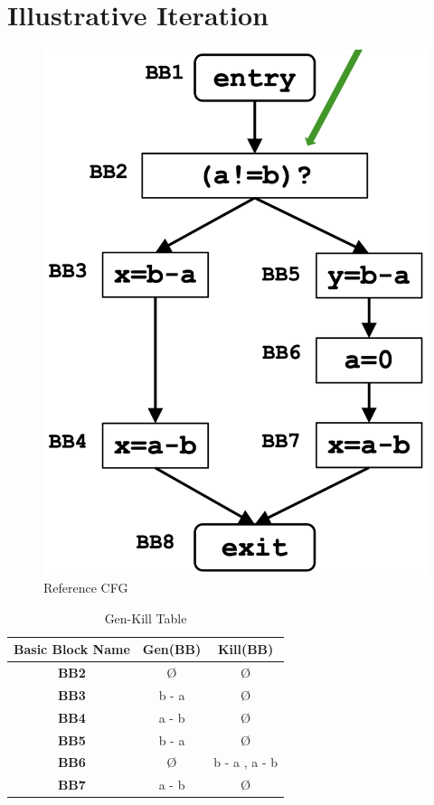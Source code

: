 \documentclass[a4paper,12pt,numbers=noenddot]{scrreprt}
\begin{document}
    \section*{Illustrative Iteration}

        \vspace{1cm}
    
        \begin{figure}[H]
            \centering
            \includegraphics[width=0.3\linewidth]{assets/vbe.png}
            \caption{Reference CFG}
            \label{fig:vbe_iteration_image}
        \end{figure}

        \vspace{1cm}

        \begin{table}[H]
            \centering
            \begin{tabular}{|c|c|c|}
                \hline
                \textbf{Basic Block Name} & \textbf{Gen(BB)} & \textbf{Kill(BB)} \\
                \hline
                \textbf{BB2} & Ø & Ø \\
                \textbf{BB3} & b - a & Ø \\
                \textbf{BB4} & a - b & Ø \\
                \textbf{BB5} & b - a & Ø \\
                \textbf{BB6} & Ø & b - a , a - b\\
                \textbf{BB7} & a - b & Ø \\
                \hline
            \end{tabular}
            \caption{Gen-Kill Table}
            \label{tab:vbe_gen_kill_table}
        \end{table}

        \vspace{1cm}
\end{document}
